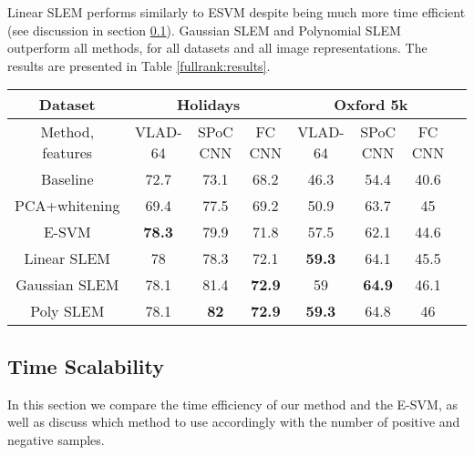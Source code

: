 Linear SLEM performs similarly to ESVM despite being much more time efficient (see discussion in section \ref{time-scale}).
Gaussian SLEM and Polynomial SLEM outperform all methods, for all datasets and all image representations.
The results are presented in Table \ref{fullrank:results}.

\begin{table*}[t]
\begin{center}
\caption{Mean average precision results for INRIA Holidays and Oxford buildings datasets, expressed as percentages. In this table, we present our results for VLAD-64 \cite{Delhumeau2013}, sum-pooling of convolutional features (SPoC) \cite{babenko15} and fully connected (fc) CNN \cite{jia2014caffe}}
\begin{tabular}{|c|c|c|c|c|c|c|c|}
\hline
Dataset & \multicolumn{3}{|c|}{\textbf{Holidays}} & \multicolumn{3}{|c|}{\textbf{Oxford 5k}}\\
\hline
Method, features & VLAD-64  & SPoC CNN & FC CNN & VLAD-64 & SPoC CNN & FC CNN\\
\hline\hline
Baseline            & 72.7         & 73.1         & 68.2         & 46.3           & 54.4         & 40.6\\
PCA+whitening       & 69.4         & 77.5         & 69.2         & 50.9           & 63.7         & 45 \\
E-SVM               & \textbf{78.3} & 79.9         & 71.8         & 57.5           & 62.1         & 44.6\\
Linear SLEM         & 78           & 78.3         & 72.1         & \textbf{59.3}   & 64.1         & 45.5\\
Gaussian SLEM       & 78.1         & 81.4         & \textbf{72.9} & 59             & \textbf{64.9} & 46.1\\
Poly SLEM           & 78.1         & \textbf{82}   & \textbf{72.9} & \textbf{59.3}  & 64.8         & 46\\
\hline
\end{tabular}
\end{center}
\label{fullrank:results}
\end{table*}


\subsection{Time Scalability} \label{time-scale}
In this section we compare the time efficiency of our method and the E-SVM, as well as discuss which method to use accordingly with the number of positive and negative samples.

